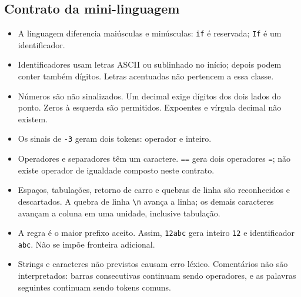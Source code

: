 \documentclass[12pt,a4paper]{article}
\begin{document}
\subsection{Contrato da mini-linguagem}
\begin{itemize}
\item A linguagem diferencia maiúsculas e minúsculas: \texttt{if} é reservada;
\texttt{If} é um identificador.
\item Identificadores usam letras ASCII ou sublinhado no início; depois podem
conter também dígitos. Letras acentuadas não pertencem a essa classe.
\item Números são não sinalizados. Um decimal exige dígitos dos dois lados do
ponto. Zeros à esquerda são permitidos. Expoentes e vírgula decimal não existem.
\item Os sinais de \texttt{-3} geram dois tokens: operador e inteiro.
\item Operadores e separadores têm um caractere. \texttt{==} gera dois operadores
\texttt{=}; não existe operador de igualdade composto neste contrato.
\item Espaços, tabulações, retorno de carro e quebras de linha são reconhecidos
e descartados. A quebra de linha \texttt{\textbackslash n} avança a linha; os demais
caracteres avançam a coluna em uma unidade, inclusive tabulação.
\item A regra é o maior prefixo aceito. Assim, \texttt{12abc} gera inteiro
\texttt{12} e identificador \texttt{abc}. Não se impõe fronteira adicional.
\item Strings e caracteres não previstos causam erro léxico. Comentários não são
interpretados: barras consecutivas continuam sendo operadores, e as palavras
seguintes continuam sendo tokens comuns.
\end{itemize}
\end{document}
